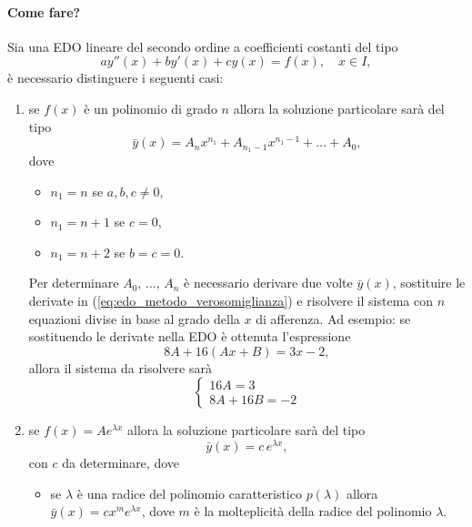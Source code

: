\paragraph{Come fare?} Sia una EDO lineare del secondo ordine a coefficienti costanti del tipo
\begin{equation}\label{eq:edo_metodo_verosomiglianza}
	ay''(x) + by'(x) + c y(x) = f(x),\quad x\in I,
\end{equation}
è necessario distinguere i seguenti casi:
\begin{enumerate}
	\item se $f(x)$ è un polinomio di grado $n$ allora la soluzione particolare sarà del tipo
	\begin{equation*}
		 \bar y(x)=A_n x^{n_1} + A_{n_1-1} x^{n_1-1} + \hdots + A_0,
	\end{equation*}
	dove
	\begin{itemize}
		\item $n_1=n$ se $a,b,c\neq0$,
		\item $n_1 = n+1$ se $c=0$,
		\item $n_1 = n + 2$ se $b=c=0$.
	\end{itemize}
	Per determinare $A_0,\, \hdots,\, A_n$ è necessario derivare due volte $\bar y(x)$, sostituire le derivate in (\ref{eq:edo_metodo_verosomiglianza}) e risolvere il sistema con $n$ equazioni divise in base al grado della $x$ di afferenza. Ad esempio: se sostituendo le derivate nella EDO è ottenuta l'espressione
	\begin{equation*}
		8A + 16(Ax + B) = 3x-2,
	\end{equation*}
	allora il sistema da risolvere sarà
	\begin{equation*}
		\begin{cases}
			16 A = 3\\
			8 A + 16 B = -2
		\end{cases}
	\end{equation*}
	
	\item se $f(x) = Ae^{\lambda x}$ allora la soluzione particolare sarà del tipo
	\begin{equation*}
		\bar y(x) = c\, e^{\lambda x},
	\end{equation*}
	con $c$ da determinare, dove
	\begin{itemize}
		\item se $\lambda$ è una radice del polinomio caratteristico $p(\lambda)$ allora $\bar y(x)=cx^me^{\lambda x}$, dove $m$ è la molteplicità della radice del polinomio $\lambda$. 
	\end{itemize}
	

\end{enumerate}
